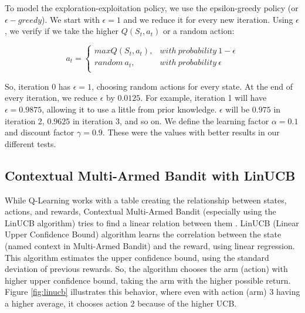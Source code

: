 To model the exploration-exploitation policy, we use the epsilon-greedy policy (or $\epsilon-greedy$). We start with $\epsilon = 1$ and we reduce it for every new iteration. Using $\epsilon$, we verify if we take the higher $Q(S_t, a_t)$ or a random action:

\begin{equation}
    a_t = \begin{cases}
        max Q(S_t, a_t), & with\ probability\ 1 - \epsilon \\
        random\ a_t, & with\ probability\ \epsilon \\
    \end{cases}
\end{equation}

So, iteration 0 has $\epsilon = 1$, choosing random actions for every state. At the end of every iteration, we reduce $\epsilon$ by $0.0125$. For example, iteration 1 will have $\epsilon = 0.9875$, allowing it to use a little from prior knowledge. $\epsilon$ will be $0.975$ in iteration 2, $0.9625$ in iteration 3, and so on. We define the learning factor $\alpha = 0.1$ and discount factor $\gamma = 0.9$. These were the values with better results in our different tests.

\subsection{Contextual Multi-Armed Bandit with LinUCB}

While Q-Learning works with a table creating the relationship between states, actions, and rewards, Contextual Multi-Armed Bandit (especially using the LinUCB algorithm) tries to find a linear relation between them \cite{li2010contextual}. LinUCB (Linear Upper Confidence Bound) algorithm learns the correlation between the state (named context in Multi-Armed Bandit) and the reward, using linear regression. This algorithm estimates the upper confidence bound, using the standard deviation of previous rewards. So, the algorithm chooses the arm (action) with higher upper confidence bound, taking the arm with the higher possible return. Figure \ref{fig:linucb} illustrates this behavior, where even with action (arm) 3 having a higher average, it chooses action 2 because of the higher UCB.

